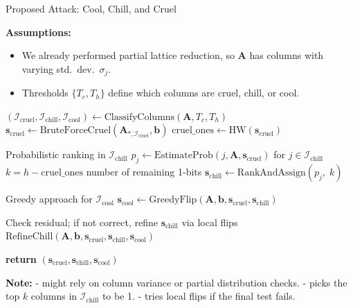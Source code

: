 \documentclass[11pt]{article}
\begin{document}
  \begin{frame}[fragile]{Proposed Attack: Cool, Chill, and Cruel}

    \small
    \textbf{Assumptions:}
    \begin{itemize}
      \item We already performed partial lattice reduction, so $\mathbf{A}$ has columns with varying std.\ dev.\ $\sigma_j$.
      \item Thresholds $\{T_c, T_h\}$ define which columns are cruel, chill, or cool.
    \end{itemize}
    
    \begin{algorithmic}
      \State $(\mathcal{I}_{\mathrm{cruel}},\mathcal{I}_{\mathrm{chill}},\mathcal{I}_{\mathrm{cool}}) \gets \text{ClassifyColumns}(\mathbf{A},T_c,T_h)$
      \State $\mathbf{s}_{\mathrm{cruel}} \gets \mathrm{BruteForceCruel}(\mathbf{A}_{*,\mathcal{I}_{\mathrm{cruel}}}, \mathbf{b})$
      \State $\mathrm{cruel\_ones} \gets \mathrm{HW}(\mathbf{s}_{\mathrm{cruel}})$
    
      \Comment Probabilistic ranking in $\mathcal{I}_{\mathrm{chill}}$
      \State $p_j \gets \mathrm{EstimateProb}(j,\mathbf{A},\mathbf{s}_{\mathrm{cruel}})$ for $j \in \mathcal{I}_{\mathrm{chill}}$
      \State $k = h - \mathrm{cruel\_ones}$  \Comment number of remaining 1-bits
      \State $\mathbf{s}_{\mathrm{chill}} \gets \mathrm{RankAndAssign}(p_j,\;k)$
    
      \Comment Greedy approach for $\mathcal{I}_{\mathrm{cool}}$
      \State $\mathbf{s}_{\mathrm{cool}} \gets \mathrm{GreedyFlip}(\mathbf{A},\mathbf{b},\mathbf{s}_{\mathrm{cruel}},\mathbf{s}_{\mathrm{chill}})$
    
      \Comment Check residual; if not correct, refine $\mathbf{s}_{\mathrm{chill}}$ via local flips
      \State $\mathrm{RefineChill}(\mathbf{A},\mathbf{b},\mathbf{s}_{\mathrm{cruel}},\mathbf{s}_{\mathrm{chill}},\mathbf{s}_{\mathrm{cool}})$
    
      \State \textbf{return} $(\mathbf{s}_{\mathrm{cruel}},\mathbf{s}_{\mathrm{chill}},\mathbf{s}_{\mathrm{cool}})$
    \EndProcedure
    \end{algorithmic}
    
    
    \textbf{Note:}
    -  might rely on column variance or partial distribution checks.
    -  picks the top $k$ columns in $\mathcal{I}_{\mathrm{chill}}$ to be 1.
    -  tries local flips if the final test fails.
    \end{frame}
\end{document}
